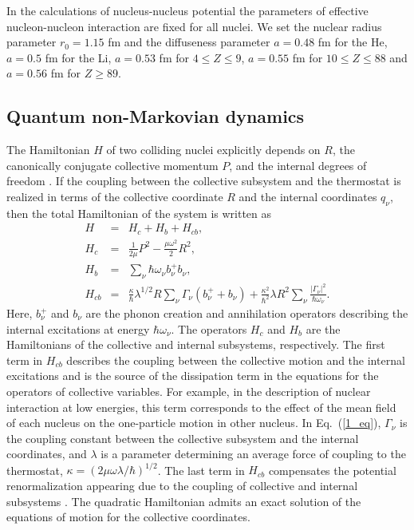 \documentclass[preprint,review,12pt]{elsarticle}
\begin{document}
  In the calculations of nucleus-nucleus potential the parameters of effective nucleon-nucleon interaction are fixed for all nuclei. We set the nuclear radius parameter $r_0=1.15$ fm and the diffuseness parameter $a=0.48$ fm for the He, $a=0.5$ fm for the Li, $a=0.53$ fm for $4\leq Z \leq 9$,
  $a=0.55$ fm for $10\leq Z \leq 88$ and $a=0.56$ fm for $Z \geq 89$.


\subsection{Quantum non-Markovian dynamics}

  The Hamiltonian $H$ of two colliding nuclei explicitly depends on $R$, the canonically
  conjugate collective momentum $P$, and the internal
  degrees of freedom \cite{Leggett,Jolos}. If the coupling between the collective subsystem and the
  thermostat is realized in terms of the collective coordinate $R$ and the internal coordinates $q_{\nu}$, then the total
  Hamiltonian of the system is written as
  \begin{eqnarray}
  H&=&H_c+H_b+H_{cb},\nonumber\\
  H_c&=&\frac{1}{2\mu}P^2-\frac{\mu\omega^2}{2}R^2,\nonumber\\
  H_b&=&\sum_{\nu}^{}\hbar\omega_\nu b_\nu^+b_\nu,\nonumber\\
  H_{cb}&=&\frac{\kappa}{\hbar}\lambda^{1/2}R\sum_{\nu}^{}\Gamma_\nu(b_\nu^+ + b_\nu)
  +\frac{\kappa^2}{\hbar^2}\lambda R^2\sum_{\nu}^{}\frac{|\Gamma_\nu|^2}{\hbar\omega_\nu}.
  \label{1_eq}
  \end{eqnarray}
  Here, $b_\nu^+$ and $b_\nu$ are the phonon creation and annihilation operators describing the internal
  excitations at energy $\hbar \omega_\nu$. The operators $H_{c}$ and $H_{b}$
  are the Hamiltonians of the collective and internal subsystems, respectively. The first term in $H_{cb}$ describes
  the coupling between the collective motion and the internal excitations and is the source of the dissipation
  term in the equations for the operators of collective variables. For example, in the description of nuclear
  interaction at low energies, this term corresponds to the effect of the mean field of each nucleus on the
  one-particle motion in other nucleus. In Eq.~(\ref{1_eq}), $\Gamma_\nu$ is the coupling constant between the collective
  subsystem and the internal coordinates, and $\lambda$ is a parameter determining an average force of
  coupling to the thermostat, $\kappa=(2\mu\omega\lambda/\hbar)^{1/2}$. The last term in $H_{cb}$ compensates
  the potential renormalization appearing due to the coupling of collective and internal subsystems \cite{Leggett}.
   The quadratic
  Hamiltonian admits an exact solution of the equations of motion for the collective coordinates.
\end{document}
